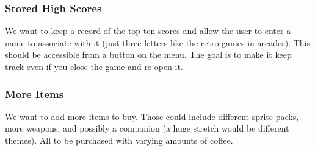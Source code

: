 \documentclass[10pt,conference,onecolumn,compsoc]{IEEEtran}
\begin{document}
\subsubsection{Stored High Scores}
We want to keep a record of the top ten scores and allow the user to enter a name to associate with it (just three letters like the retro games in arcades). This should be accessible from a button on the menu. The goal is to make it keep track even if you close the game and re-open it.

\subsubsection{More Items} We want to add more items to buy. Those could include different sprite packs, more weapons, and possibly a companion (a huge stretch would be different themes). All to be purchased with varying amounts of coffee.


\end{document}
